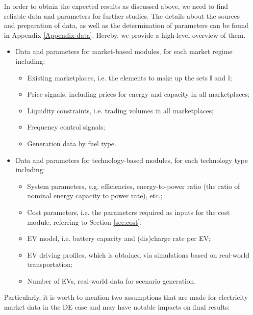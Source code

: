In order to obtain the expected results as discussed above, we need to find reliable data and parameters for further studies. The details about the sources and preparation of data, as well as the determination of parameters can be found in Appendix \ref{Appendix-data}. Hereby, we provide a high-level overview of them.

\begin{itemize}
	\item Data and parameters for market-based modules, for each market regime including:
	\begin{itemize}
		\item Existing marketplaces, i.e. the elements to make up the sets $\mathbb{I}$ and $\mathbb{I}$;
		\item Price signals, including prices for energy and capacity in all marketplaces;
		\item Liquidity constraints, i.e. trading volumes in all marketplaces;
		\item Frequency control signals;
		\item Generation data by fuel type.
	\end{itemize}
	\item Data and parameters for technology-based modules, for each technology type including:
	\begin{itemize}
		\item System parameters, e.g. efficiencies, energy-to-power ratio (the ratio of nominal energy capacity to power rate), etc.;
		\item Cost parameters, i.e. the parameters required as inputs for the cost module, referring to Section \ref{sec:cost};
		\item EV model, i.e. battery capacity and (dis)charge rate per EV;
		\item EV driving profiles, which is obtained via simulations based on real-world transportation;
		\item Number of EVs, real-world data for scenario generation.
	\end{itemize}
\end{itemize}

Particularly, it is worth to mention two assumptions that are made for electricity market data in the DE case and may have notable impacts on final results:

